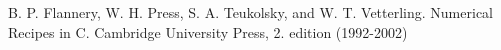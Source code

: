 \documentclass[a4paper,11pt]{book}
\begin{document}
\begin{thebibliography}{------}
     B. P. Flannery, W. H. Press, S. A. Teukolsky, and W. T. Vetterling. Numerical Recipes in C. Cambridge University Press, 2. edition (1992-2002)
\end{thebibliography}
\end{document}
